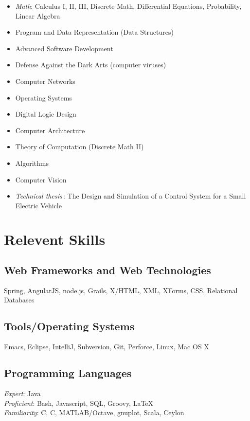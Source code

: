\documentclass[a4paper,11pt]{article}
\newcommand{\CC}{C\nolinebreak\hspace{-.05em}\raisebox{.4ex}{\tiny\bf
    +}\nolinebreak\hspace{-.10em}\raisebox{.4ex}{\tiny\bf +}}
\def\CC{{C\nolinebreak[4]\hspace{-.05em}\raisebox{.4ex}{\tiny\bf ++}}}
\begin{document}
  \begin{multicols}{2} 
    \raggedright

    \begin{itemize}
    \item \textit{Math}: Calculus I, II, III, Discrete Math, Differential
      Equations, Probability, Linear Algebra
    \item Program and Data Representation (Data Structures)
    \item Advanced Software Development
    \item Defense Against the Dark Arts (computer viruses)
    \item Computer Networks
    \item Operating Systems
    \item Digital Logic Design
    \item Computer Architecture
    \item Theory of Computation (Discrete Math II)
    \item Algorithms
    \item Computer Vision
    \item \textsl{Technical thesis\,}: The Design and Simulation of a Control
      System for a Small Electric Vehicle
    \end{itemize}
  \end{multicols}


  \section*{Relevent Skills}

  \begin{multicols}{2}
    \raggedright

    \subsection*{Web Frameworks and Web Technologies}

    Spring, AngularJS, node.js, Grails, X/HTML, XML, XForms, CSS, Relational
    Databases
    
    \subsection*{Tools/Operating Systems}

    Emacs, Eclipse, IntelliJ, Subversion, Git, Perforce, Linux, Mac OS X

    \subsection*{Programming Languages}

    \textsl{Expert}: Java \\
    \textsl{Proficient}: Bash, Javascript, SQL, Groovy, \LaTeX \\
    \textsl{Familiarity}: C, \CC, MATLAB/Octave, gnuplot, Scala, Ceylon
    
  \end{multicols}
  
\end{document}
